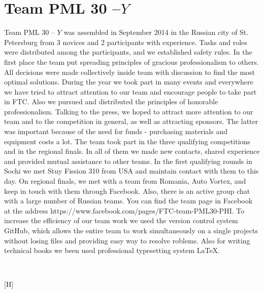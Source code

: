 
\section{Team PML 30 --${Y}$} 
	Team PML 30 -- ${Y}$ was assembled in September 2014 in the Russian city of St. Petersburg from 3 novices and 2 participants with experience. Tasks and roles were distributed among the participants, and we established safety rules. In the first place the team put spreading principles of gracious professionalism to others. All decisions were made collectively inside team with discussion to find the most optimal solutions. 
	During the year we took part in many events and everywhere we have tried to attract attention to our team and encourage people to take part in FTC. Also we pursued and distributed the principles of honorable professionalism. Talking to the press, we hoped to attract more attention to our team and to the competition in general, as well as attracting sponsors. The latter was important because of the need for funds - purchasing materials and equipment costs a lot.
	The team took part in the three qualifying competitions and in the regional finals. In all of them we made new contacts, shared experience and provided mutual assistance to other teams. In the first qualifying rounds in Sochi we met Stuy Fission 310 from USA and maintain contact with them to this day. On regional finals, we met with a team from Romania, Auto Vortex, and keep in touch with them through Facebook. Also, there is an active group chat with a large number of Russian teams. You can find the team page in Facebook at the address https://www.facebook.com/pages/FTC-team-PML30-PHI.
	To increase the efficiency of our team work we used the version control system GitHub, which allows the entire team to work simultaneously on a single projects without losing files and providing easy way to resolve roblems. Also for writing technical books we been used professional typesetting system LaTeX.
	\begin{figure}[H]
		\\
	\end{figure}[H]
\fillpage

